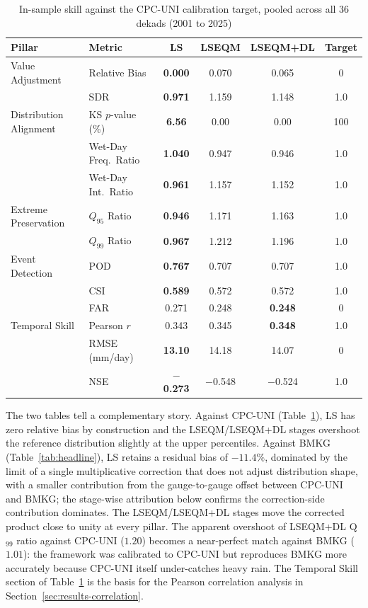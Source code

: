 \begin{table}[H]
\centering
\caption[In-sample skill against the CPC-UNI calibration target]{In-sample skill against the CPC-UNI calibration target,
pooled across all 36 dekads (2001 to 2025)\label{tab:headline-cpc}}
\begingroup\small
\begin{tabular}{@{}llcccc@{}}
\toprule
Pillar & Metric & LS & LSEQM & LSEQM+DL & Target \\
\midrule
Value Adjustment
  & Relative Bias        & \textbf{0.000} & 0.070 & 0.065 & 0 \\
  & SDR                  & \textbf{0.971} & 1.159 & 1.148 & 1.0 \\
Distribution Alignment
  & KS $p$-value (\%)    & \textbf{6.56} & 0.00 & 0.00 & 100 \\
  & Wet-Day Freq.\ Ratio & \textbf{1.040} & 0.947 & 0.946 & 1.0 \\
  & Wet-Day Int.\ Ratio  & \textbf{0.961} & 1.157 & 1.152 & 1.0 \\
Extreme Preservation
  & $Q_{95}$ Ratio       & \textbf{0.946} & 1.171 & 1.163 & 1.0 \\
  & $Q_{99}$ Ratio       & \textbf{0.967} & 1.212 & 1.196 & 1.0 \\
Event Detection
  & POD                  & \textbf{0.767} & 0.707 & 0.707 & 1.0 \\
  & CSI                  & \textbf{0.589} & 0.572 & 0.572 & 1.0 \\
  & FAR                  & 0.271 & 0.248 & \textbf{0.248} & 0 \\
\midrule
Temporal Skill
  & Pearson $r$          & 0.343 & 0.345 & \textbf{0.348} & 1.0 \\
  & RMSE (mm/day)        & \textbf{13.10} & 14.18 & 14.07 & 0 \\
  & NSE                  & \textbf{$-$0.273} & $-$0.548 & $-$0.524 & 1.0 \\
\bottomrule
\end{tabular}
\endgroup
\end{table}

The two tables tell a complementary story. Against CPC-UNI
(Table~\ref{tab:headline-cpc}), LS has zero relative bias by
construction and the LSEQM/LSEQM+DL stages overshoot the
reference distribution slightly at the upper percentiles. Against
BMKG (Table~\ref{tab:headline}), LS retains a residual bias of
$-11.4\%$, dominated by the limit of a single multiplicative
correction that does not adjust distribution shape, with a smaller
contribution from the gauge-to-gauge offset between CPC-UNI and
BMKG; the stage-wise attribution below confirms the correction-side
contribution dominates. The LSEQM/LSEQM+DL stages move the corrected
product close to unity at every pillar. The apparent overshoot
of LSEQM+DL Q$_{99}$ ratio against CPC-UNI ($1.20$) becomes a
near-perfect match against BMKG ($1.01$): the framework was
calibrated to CPC-UNI but reproduces BMKG more accurately because
CPC-UNI itself under-catches heavy rain. The Temporal Skill
section of Table~\ref{tab:headline-cpc} is the basis for the
Pearson correlation analysis in
Section~\ref{sec:results-correlation}.

